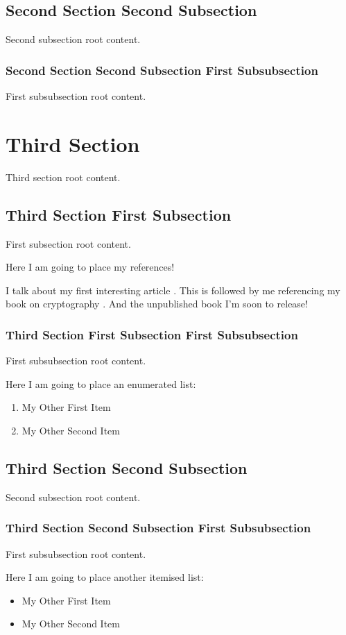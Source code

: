 \documentclass[12pt,twocolumn,a4paper,twoside]{IEEEtran}
\begin{document}
\subsection{Second Section Second Subsection}
Second subsection root content.
\subsubsection{Second Section Second Subsection First Subsubsection}
First subsubsection root content.
\section{Third Section}
Third section root content.
\subsection{Third Section First Subsection}
First subsection root content.

Here I am going to place my references!

I talk about my first interesting article \cite{newCipher}.
This is followed by me referencing my book on cryptography \cite{appliedCryp}.
And the unpublished book I'm soon to release! \cite{unPub}

\subsubsection{Third Section First Subsection First Subsubsection}
First subsubsection root content.

Here I am going to place an enumerated list:

\begin{enumerate}
\item My Other First Item
\item My Other Second Item
\end{enumerate}

\subsection{Third Section Second Subsection}
Second subsection root content.
\subsubsection{Third Section Second Subsection First Subsubsection}
First subsubsection root content.

Here I am going to place another itemised list:

\begin{itemize}
\item My Other First Item
\item My Other Second Item
\end{itemize}



\end{document}
